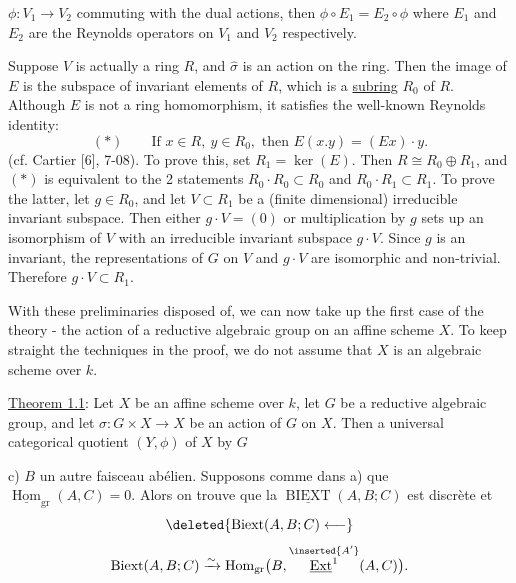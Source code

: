 
$\phi:V_1\longrightarrow V_2$ commuting with the dual actions, then $\phi\circ E_1=E_2\circ\phi$ where $E_1$ and $E_2$ are the Reynolds operators on $V_1$ and $V_2$ respectively.

Suppose $V$ is actually a ring $R$, and $\hat\sigma$ is an action on the ring. Then the image of $E$ is the subspace of invariant elements of $R$, which is a \uline{subring} $R_0$ of $R$. Although $E$ is not a ring homomorphism, it satisfies the well-known Reynolds identity:
\[
(*)\qquad\text{If }x\in R,\ y\in R_0,\text{ then }E(x.y)=(Ex)\cdot y.
\]
(cf. Cartier [6], 7-08). To prove this, set $R_1=\ker(E)$. Then $R\cong R_0\oplus R_1$, and $(*)$ is equivalent to the 2 statements $R_0\cdot R_0\subset R_0$ and $R_0\cdot R_1\subset R_1$. To prove the latter, let $g\in R_0$, and let $V\subset R_1$ be a (finite dimensional) irreducible invariant subspace. Then either $g\cdot V=(0)$ or multiplication by $g$ sets up an isomorphism of $V$ with an irreducible invariant subspace $g\cdot V$. Since $g$ is an invariant, the representations of $G$ on $V$ and $g\cdot V$ are isomorphic and non-trivial. Therefore $g\cdot V\subset R_1$.

 With these preliminaries disposed of, we can now take up the first case of the theory - the action of a reductive algebraic group on an affine scheme $X$. To keep straight the techniques in the proof, we do not assume that $X$ is an algebraic scheme over $k$.

\uline{Theorem 1.1}: Let $X$ be an affine scheme over $k$, let $G$ be a reductive algebraic group, and let $\sigma:G\mathbin{\times}X\longrightarrow X$ be an action of $G$ on $X$. Then a universal categorical quotient $(Y,\phi)$ of $X$ by $G$



c)  $B$ un autre faisceau abélien. Supposons comme dans a) que  $\underline{\operatorname{Hom}}_{\mathrm{gr}}(A,C)=0$. Alors on trouve que la    $\underline{\operatorname{BIEXT}}(A,B;C)$ est discrète et
\[
\deleted{\operatorname{Biext}(A,B;C)\longleftarrow}
\]
\[
\operatorname{Biext}(A,B;C)\xrightarrow{\sim}\operatorname{Hom}_{\mathrm{gr}}\bigl(B,\overset{\inserted{A'}}{\underline{\operatorname{Ext}}^1}(A,C)\bigr).
\]

